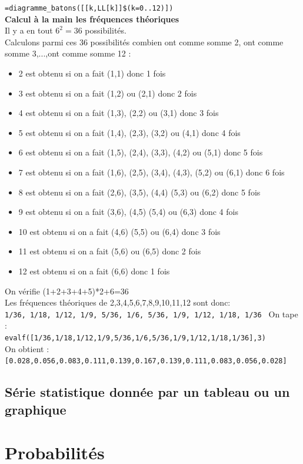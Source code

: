 \documentclass[a4paper,11pt]{book}
\begin{document}
{\tt =diagramme\_batons([[k,LL[k]]\$(k=0..12)])}\\
{\bf Calcul \`a la main les fr\'equences th\'eoriques}\\
Il y a en tout $6^2=36$ possibilit\'es.\\
Calculons parmi ces 36 possibilit\'es combien ont comme somme 2,
ont comme somme 3,...,ont comme somme 12 :
\begin{itemize}
\item 2 est obtenu si on a fait (1,1) donc 1 fois
\item 3 est obtenu si on a fait (1,2) ou (2,1) donc 2 fois
\item 4 est obtenu si on a fait (1,3), (2,2) ou (3,1) donc 3 fois
\item 5 est obtenu si on a fait (1,4), (2,3), (3,2) ou (4,1) donc 4 fois
\item 6 est obtenu si on a fait (1,5), (2,4), (3,3), (4,2) ou (5,1) donc 5 fois
\item 7 est obtenu si on a fait (1,6), (2,5), (3,4), (4,3), (5,2) ou (6,1) donc
 6 fois
\item 8 est obtenu si on a fait (2,6), (3,5), (4,4) (5,3) ou (6,2) donc 5 fois
\item 9 est obtenu si on a fait  (3,6), (4,5) (5,4) ou (6,3) donc 4 fois
\item 10 est obtenu si on a fait (4,6) (5,5) ou (6,4) donc 3 fois
\item 11 est obtenu si on a fait (5,6) ou (6,5) donc 2 fois
\item 12 est obtenu si on a fait (6,6) donc 1 fois
\end{itemize}
On v\'erifie (1+2+3+4+5)*2+6=36\\
Les fr\'equences th\'eoriques de 2,3,4,5,6,7,8,9,10,11,12  sont donc:\\
{\tt 1/36, 1/18, 1/12, 1/9, 5/36, 1/6, 5/36, 1/9, 1/12, 1/18, 1/36 }
On tape :\\
{\tt evalf([1/36,1/18,1/12,1/9,5/36,1/6,5/36,1/9,1/12,1/18,1/36],3)}\\ 
On obtient :\\
{\tt [0.028,0.056,0.083,0.111,0.139,0.167,0.139,0.111,0.083,0.056,0.028]}
\section{S\'erie statistique donn\'ee par un tableau ou un graphique}
\chapter{Probabilit\'es}
\end{document}
